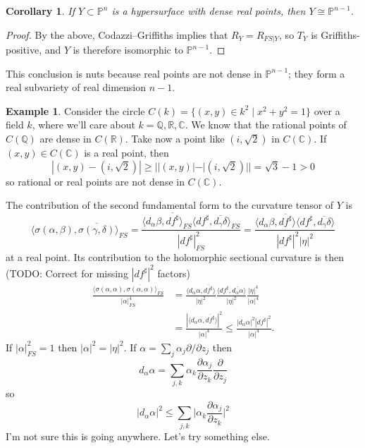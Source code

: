 \documentclass[11pt]{article}
\newtheorem{coro}[theo]{Corollary}
\theoremstyle{definition}
\newtheorem{exam}[theo]{Example}
\newcommand{\kk}[1]{\mathbb{#1}}
\def\ov#1{\overline{#1}}
\begin{document}
\begin{coro}
If $Y \subset \kk P^{n}$ is a hypersurface with dense real points, then $Y \cong \kk P^{n-1}$.
\end{coro}

\begin{proof}
By the above, Codazzi--Griffiths implies that $R_{Y} = R_{FS|Y}$, so $T_{Y}$ is Griffiths-positive, and $Y$ is therefore isomorphic to $\kk P^{n-1}$.
\end{proof}

This conclusion is nuts because real points are not dense in $\kk P^{n-1}$; they form a real subvariety of real dimension $n-1$.

\begin{exam}
Consider the circle $C(k) = \{(x,y) \in k^{2} \mid x^{2} + y^{2} = 1\}$ over a field $k$, where we'll care about $k = \kk Q, \kk R, \kk C$.
We know that the rational points of $C(\kk Q)$ are dense in $C(\kk R)$.
Take now a point like $(i,\sqrt 2)$ in $C(\kk C)$.
If $(x,y) \in  C(\kk C)$ is a real point, then
\[
  |(x,y) - (i,\sqrt 2)|
  \geq ||(x,y)| - |(i,\sqrt 2)||
  = \sqrt 3 - 1 > 0
\]
so rational or real points are not dense in $C(\kk C)$.
\end{exam}


The contribution of the second fundamental form to the curvature tensor of $Y$ is
\[
  \langle \sigma(\alpha, \beta), \ov{\sigma(\gamma, \delta)} \rangle_{FS}
  = \frac{\langle d_{\alpha}\beta, \ov{df^{\sharp}} \rangle_{FS}
  \langle df^{\sharp}, \ov{d_{\gamma}\delta} \rangle_{FS}}{|df^{\sharp}|^{2}_{FS}}
  = \frac{\langle d_{\alpha}\beta, \ov{df^{\sharp}} \rangle
  \langle df^{\sharp}, \ov{d_{\gamma}\delta} \rangle }{|df^{\sharp}|^{2}|\eta|^{2}}
\]
at a real point. Its contribution to the holomorphic sectional curvature is then
(TODO: Correct for missing $|df^{\sharp}|^{2}$ factors)
\begin{align*}
  \frac{\langle \sigma(\alpha, \alpha), \ov{\sigma(\alpha, \alpha)} \rangle_{FS}}{|\alpha|^{4}_{FS}}
  &= \frac{\langle d_{\alpha}\alpha, \ov{df^{\sharp}} \rangle}{|\eta|^{2}}
  \frac{\langle df^{\sharp}, \ov{d_{\alpha}\alpha} \rangle}{|\eta|^{2}}
  \frac{|\eta|^{4}}{|\alpha|^{4}}
    \\
  &= \frac{|\langle d_{\alpha}\alpha, \ov{df^{\sharp}} \rangle|^{2}}{|\alpha|^{4}}
  \leq \frac{|d_{\alpha}\alpha|^{2} |df^{\sharp}|^{2}}{|\alpha|^{4}}.
\end{align*}
If $|\alpha|^{2}_{FS} = 1$ then $|\alpha|^{2} = |\eta|^{2}$.
If $\alpha = \sum_{j} \alpha_{j} \partial / \partial z_{j}$ then
\[
  d_{\alpha} \alpha
  = \sum_{j,k} \alpha_{k} \frac{\partial{\alpha_{j}}}{\partial z_{k}} \frac{\partial}{\partial z_{j}}
\]
so
\[
  |d_{\alpha} \alpha|^{2}
  \leq \sum_{j,k}
  \biggl|
  \alpha_{k} \frac{\partial{\alpha_{j}}}{\partial z_{k}}
  \biggr|^{2}
\]
I'm not sure this is going anywhere. Let's try something else.
\end{document}
